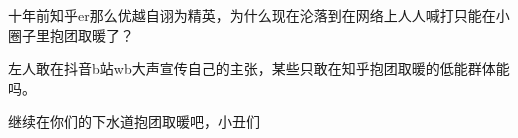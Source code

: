 \begin{zhihuanswer}
十年前知乎er那么优越自诩为精英，为什么现在沦落到在网络上人人喊打只能在小圈子里抱团取暖了？

左人敢在抖音b站wb大声宣传自己的主张，某些只敢在知乎抱团取暖的低能群体能吗。

继续在你们的下水道抱团取暖吧，小丑们
\end{zhihuanswer}
